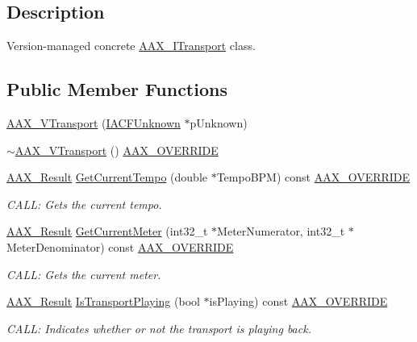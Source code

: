 \subsection{Description}
Version-\/managed concrete \mbox{\hyperlink{a01885}{A\+A\+X\+\_\+\+I\+Transport}} class. \subsection*{Public Member Functions}
\begin{DoxyCompactItemize}
\item 
\mbox{\hyperlink{a01941_a8ce1b37bff86703b1aa542917dbe4bf9}{A\+A\+X\+\_\+\+V\+Transport}} (\mbox{\hyperlink{a01409}{I\+A\+C\+F\+Unknown}} $\ast$p\+Unknown)
\item 
\mbox{\hyperlink{a01941_a3b5f278e1065e3dbbb6acffb54aaffec}{$\sim$\+A\+A\+X\+\_\+\+V\+Transport}} () \mbox{\hyperlink{a00392_ac2f24a5172689ae684344abdcce55463}{A\+A\+X\+\_\+\+O\+V\+E\+R\+R\+I\+DE}}
\item 
\mbox{\hyperlink{a00392_a4d8f69a697df7f70c3a8e9b8ee130d2f}{A\+A\+X\+\_\+\+Result}} \mbox{\hyperlink{a01941_a611d5261c674060c1ba90e4e8b0c02f2}{Get\+Current\+Tempo}} (double $\ast$Tempo\+B\+PM) const \mbox{\hyperlink{a00392_ac2f24a5172689ae684344abdcce55463}{A\+A\+X\+\_\+\+O\+V\+E\+R\+R\+I\+DE}}
\begin{DoxyCompactList}\small\item\em C\+A\+LL\+: Gets the current tempo. \end{DoxyCompactList}\item 
\mbox{\hyperlink{a00392_a4d8f69a697df7f70c3a8e9b8ee130d2f}{A\+A\+X\+\_\+\+Result}} \mbox{\hyperlink{a01941_a95785b25a81811427d08132e4fb11858}{Get\+Current\+Meter}} (int32\+\_\+t $\ast$Meter\+Numerator, int32\+\_\+t $\ast$Meter\+Denominator) const \mbox{\hyperlink{a00392_ac2f24a5172689ae684344abdcce55463}{A\+A\+X\+\_\+\+O\+V\+E\+R\+R\+I\+DE}}
\begin{DoxyCompactList}\small\item\em C\+A\+LL\+: Gets the current meter. \end{DoxyCompactList}\item 
\mbox{\hyperlink{a00392_a4d8f69a697df7f70c3a8e9b8ee130d2f}{A\+A\+X\+\_\+\+Result}} \mbox{\hyperlink{a01941_a69c0acbc3e5a18e1a8ffb690eb00da79}{Is\+Transport\+Playing}} (bool $\ast$is\+Playing) const \mbox{\hyperlink{a00392_ac2f24a5172689ae684344abdcce55463}{A\+A\+X\+\_\+\+O\+V\+E\+R\+R\+I\+DE}}
\begin{DoxyCompactList}\small\item\em C\+A\+LL\+: Indicates whether or not the transport is playing back. \end{DoxyCompactList}\item 

\end{DoxyCompactItemize}
